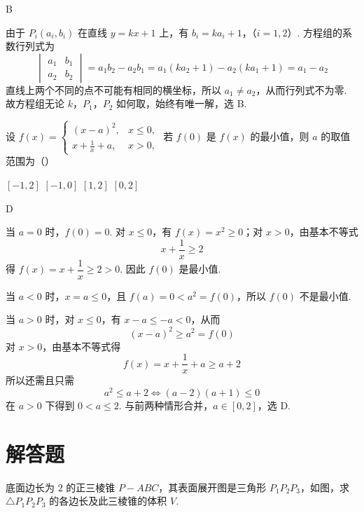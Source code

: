 \begin{answer}
B
\end{answer}

\begin{solution}
由于 \(P_i(a_i,b_i)\) 在直线 \(y=kx+1\) 上，有
\(b_i=ka_i+1\)，（\(i=1,2\)）.
方程组的系数行列式为
\[
\begin{vmatrix}
a_1&b_1\\
a_2&b_2
\end{vmatrix}
=a_1b_2-a_2b_1
=a_1(ka_2+1)-a_2(ka_1+1)
=a_1-a_2
\]
直线上两个不同的点不可能有相同的横坐标，所以 \(a_1\neq a_2\)，从而行列式不为零. 故方程组无论 \(k\)，\(P_1\)，\(P_2\) 如何取，始终有唯一解，选 B.
\end{solution}

\begin{problem}
设 \( f(x) = \begin{cases}
(x - a)^2, & x \leqslant 0,\\
x + \frac{1}{x} + a, & x > 0,
\end{cases} \) 若 \( f(0) \) 是 \( f(x) \) 的最小值，则 \( a \) 的取值范围为（\quad）

\choices
    {\([-1, 2]\)}
    {\([-1,0]\)}
    {\([1, 2]\)}
    {\([0,2]\)}
\end{problem}

\begin{answer}
D
\end{answer}

\begin{solution}
当 \(a=0\) 时，\(f(0)=0\). 对 \(x\leqslant0\)，有 \(f(x)=x^2\geqslant0\)；对 \(x>0\)，由基本不等式
\[
x+\frac1x\geqslant2
\]
得 \(f(x)=x+\dfrac1x\geqslant2>0\). 因此 \(f(0)\) 是最小值.

当 \(a<0\) 时，\(x=a\leqslant0\)，且 \(f(a)=0<a^2=f(0)\)，所以 \(f(0)\) 不是最小值.

当 \(a>0\) 时，对 \(x\leqslant0\)，有 \(x-a\leqslant-a<0\)，从而
\[
(x-a)^2\geqslant a^2=f(0)
\]
对 \(x>0\)，由基本不等式得
\[
f(x)=x+\frac1x+a\geqslant a+2
\]
所以还需且只需
\[
a^2\leqslant a+2
\iff (a-2)(a+1)\leqslant0
\]
在 \(a>0\) 下得到 \(0<a\leqslant2\). 与前两种情形合并，\(a\in[0,2]\)，选 D.
\end{solution}

\section{解答题}

\begin{problem}
底面边长为 \(2\) 的正三棱锥 \(P-ABC\)，其表面展开图是三角形 \(P_{1}P_{2}P_{3}\)，如图，求 \( \triangle P_{1}P_{2}P_{3} \) 的各边长及此三棱锥的体积 \(V\).

\end{problem}

